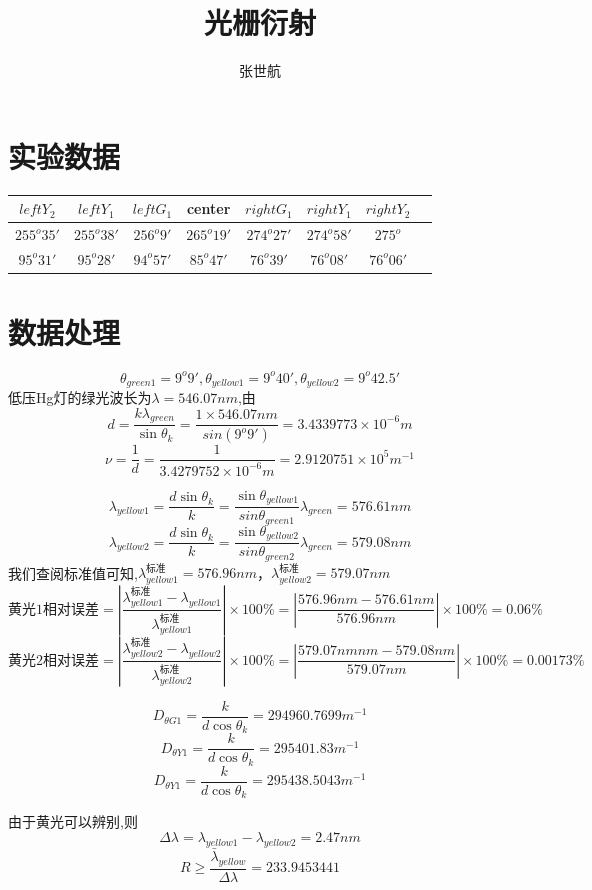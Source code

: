 \documentclass[10pt, a4paper]{article}
\title{光栅衍射}
\author{张世航}
\begin{document}
	\maketitle
	\section{实验数据}
	\begin{tabular}{|c|c|c|c|c|c|c|c|}
		\hline
		$left Y_2$ & $left Y_1$ & $left G_1$ & center & $right G_1$ & $right Y_1$ & $right Y_2$ \\
		\hline
		$255^o35'$ & $255^o38'$ & $256^o9'$ & $265^o19'$ & $274^o27'$ & $274^o58'$ & $275^o$ \\
		\hline
		$95^o31'$ & $95^o28'$ & $94^o57'$ & $85^o47'$ & $76^o39'$ & $76^o08'$ & $76^o06'$ \\
		\hline
	\end{tabular}
	\section{数据处理}
	\[\theta_{green1} = 9^o9',\theta_{yellow1} = 9^o40',\theta_{yellow2}=9^o42.5'\]
	低压Hg灯的绿光波长为$\lambda=546.07nm$,由\[d = \frac{k\lambda_{green}}{\sin{\theta_k}}=\frac{1\times546.07nm}{sin(9^o9')}=3.4339773\times10^{-6}m\]
	\[\nu = \frac{1}{d} = \frac{1}{3.4279752\times10^{-6}m} = 2.9120751\times10^5m^{-1}\]
	
	\[\lambda_{yellow1} = \frac{d \sin\theta_k}{k} = \frac{\sin\theta_{yellow1}}{sin\theta_{green1}}\lambda_{green}=576.61nm\]
	\[\lambda_{yellow2} = \frac{d \sin\theta_k}{k} = \frac{\sin\theta_{yellow2}}{sin\theta_{green2}}\lambda_{green}=579.08nm\]
	我们查阅标准值可知,$\lambda_{yellow1}^{\text{标准}}=576.96 nm$，$\lambda_{yellow2}^{\text{标准}}=579.07 nm$
	\[\text{黄光1相对误差}= |\frac{\lambda_{yellow1}^{\text{标准}}-\lambda_{yellow1}}{\lambda_{yellow1}^{\text{标准}}}|\times100\%=|\frac{576.96 nm-576.61nm}{576.96 nm}|\times100\% = 0.06\%\]
	\[\text{黄光2相对误差}= |\frac{\lambda_{yellow2}^{\text{标准}}-\lambda_{yellow2}}{\lambda_{yellow2}^{\text{标准}}}|\times100\%=|\frac{579.07 nm nm-579.08 nm}{579.07 nm}|\times100\% = 0.00173\%\]
	
	\[D_{\theta G1} = \frac{k}{d\cos\theta_k}=294960.7699m^{-1}\]
	\[D_{\theta Y1} = \frac{k}{d\cos\theta_k}=295401.83m^{-1}\]
	\[D_{\theta Y1} = \frac{k}{d\cos\theta_k}=295438.5043m^{-1}\]
	
	由于黄光可以辨别,则
	\[\Delta\lambda = \lambda_{yellow1}-\lambda_{yellow2} = 2.47nm\]
	\[R \geqslant \frac{\bar{\lambda}_{yellow}}{\Delta\lambda}=233.9453441\]
\end{document}
